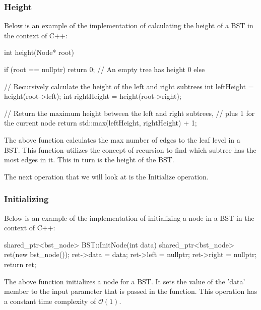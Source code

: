 \begin{highlight}

\subsubsection*{Height}

Below is an example of the implementation of calculating the height of a BST in the context of C++:

\begin{code}
int height(Node* root) {
    if (root == nullptr) {
        return 0;  // An empty tree has height 0
    }
    else {
        // Recursively calculate the height of the left and right subtrees
        int leftHeight = height(root->left);
        int rightHeight = height(root->right);

        // Return the maximum height between the left and right subtrees, 
        // plus 1 for the current node
        return std::max(leftHeight, rightHeight) + 1;
    }
}    
\end{code}

\noindent The above function calculates the max number of edges to the leaf level in a BST. This function utilizes the concept of recursion to find which subtree has the most edges in it. This in turn is the
height of the BST.

\end{highlight}

The next operation that we will look at is the Initialize operation.

\begin{highlight}

\subsubsection*{Initializing}

Below is an example of the implementation of initializing a node in a BST in the context of C++:

\begin{code}
shared_ptr<bst_node> BST::InitNode(int data){
    shared_ptr<bst_node> ret(new bst_node());
    ret->data = data;
    ret->left = nullptr;
    ret->right = nullptr;
    return ret;
}
\end{code}

The above function initializes a node for a BST. It sets the value of the 'data' member to the input parameter that is passed in the function. This operation has a constant time complexity of 
$\mathcal{O}(1)$.

\end{highlight}

